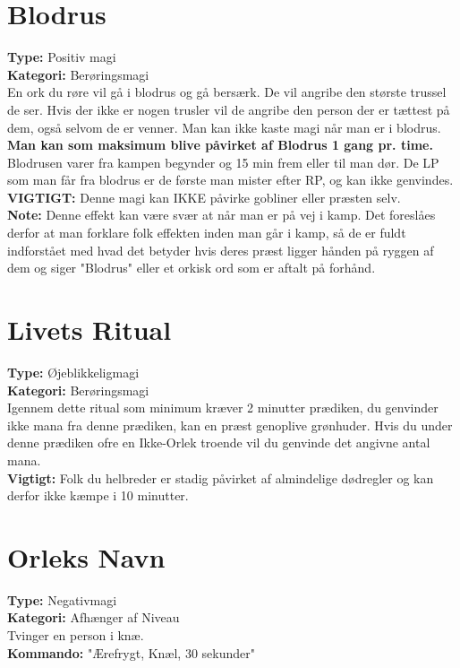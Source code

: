 \section{Blodrus}
\textbf{Type:} Positiv magi\\
\textbf{Kategori:} Berøringsmagi\\
En ork du røre vil gå i blodrus og gå bersærk. De vil angribe den største trussel de ser. Hvis der ikke er nogen trusler vil de angribe den person der er tættest på dem, også selvom de er venner. Man kan ikke kaste magi når man er i blodrus. \textbf{Man kan som maksimum blive påvirket af Blodrus 1 gang pr. time.}
Blodrusen varer fra kampen begynder og 15 min frem eller til man dør. De LP som man får fra blodrus er de første man mister efter RP, og kan ikke genvindes.\\
\textbf{VIGTIGT:} Denne magi kan IKKE påvirke gobliner eller præsten selv.\\
\textbf{Note:} Denne effekt kan være svær at når man er på vej i kamp. Det foreslåes derfor at man forklare folk effekten inden man går i kamp, så de er fuldt indforstået med hvad det betyder hvis deres præst ligger hånden på ryggen af dem og siger "Blodrus" eller et orkisk ord som er aftalt på forhånd.

\section{Livets Ritual}
\textbf{Type:} Øjeblikkeligmagi\\ 
\textbf{Kategori:} Berøringsmagi\\
Igennem dette ritual som minimum kræver 2 minutter prædiken, du genvinder ikke mana fra denne prædiken, kan en præst genoplive grønhuder. Hvis du under denne prædiken ofre en Ikke-Orlek troende vil du genvinde det angivne antal mana.\\
\textbf{Vigtigt:} Folk du helbreder er stadig påvirket af almindelige dødregler og kan derfor ikke kæmpe i 10 minutter.

\section{Orleks Navn}
\textbf{Type:} Negativmagi\\ 
\textbf{Kategori:} Afhænger af Niveau\\
Tvinger en person i knæ.\\
\textbf{Kommando:} "Ærefrygt, Knæl, 30 sekunder"

